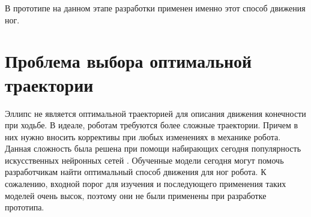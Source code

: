 В прототипе на данном этапе разработки применен именно этот способ движения ног.

\section{Проблема выбора оптимальной траектории}

Эллипс не является оптимальной траекторией для описания движения конечности при ходьбе. В идеале, роботам требуются более сложные траектории. Причем в них нужно вносить коррективы при любых изменениях в механике робота. Данная сложность была решена при помощи набирающих сегодня популярность искусственных нейронных сетей \cite{Singla2018}. Обученные модели сегодня могут помочь разработчикам найти оптимальный способ движения для ног робота. К сожалению, входной порог для изучения и последующего применения таких моделей очень высок, поэтому они не были применены при разработке прототипа.